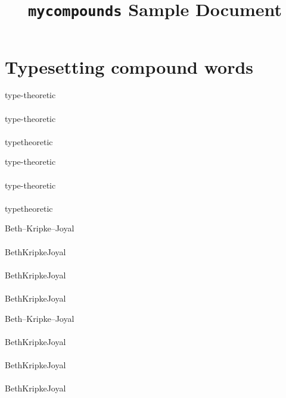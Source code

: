 \documentclass{article}
\begin{document}
\title{\texttt{mycompounds} Sample Document}
\author{}
\date{}

\maketitle

\begin{verbatim*}
\usepackage[hyperref]{mycompounds}
\usepackage{hyperref}
\end{verbatim*}

\section{Typesetting compound words}

\begin{verbatim*}
\begin{minipage}{0pt}
type-theoretic\\\\
type\hyp{}theoretic\\\\
type\nbhyp{}theoretic\\
\end{minipage}
\end{verbatim*}
%
\begin{minipage}{0pt}
  type-theoretic\\\\
  type\hyp{}theoretic\\\\
  type\nbhyp{}theoretic\\
\end{minipage}

\begin{verbatim*}
\begin{minipage}{0pt}
Beth--Kripke--Joyal\\\\
Beth\textendash{}Kripke\textendash{}Joyal\\\\
Beth\ndash{}Kripke\ndash{}Joyal\\\\
Beth\nbndash{}Kripke\nbndash{}Joyal\\
\end{minipage}
\end{verbatim*}
%
\begin{minipage}{0pt}
  Beth--Kripke--Joyal\\\\
  Beth\textendash{}Kripke\textendash{}Joyal\\\\
  Beth\ndash{}Kripke\ndash{}Joyal\\\\
  Beth\nbndash{}Kripke\nbndash{}Joyal\\
\end{minipage}
\end{document}
